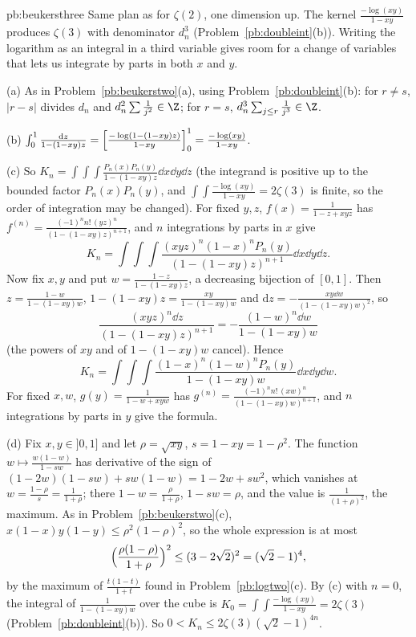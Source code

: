 \begin{solution}{pb:beukersthree}
\idea Same plan as for $\zeta(2)$, one dimension up. The kernel $\frac{-\log(xy)}{1-xy}$ produces $\zeta(3)$ with denominator $d_n^3$
(Problem~\ref{pb:doubleint}(b)). Writing the logarithm as an integral in a third variable gives room for a change of variables that
lets us integrate by parts in both $x$ and $y$.

\writeup (a) As in Problem~\ref{pb:beukerstwo}(a), using Problem~\ref{pb:doubleint}(b): for $r\ne s$, $|r-s|$ divides $d_n$ and $d_n^2\sum\frac1{j^2}\in\Z$; for
$r=s$, $d_n^3\sum_{j\le r}\frac1{j^3}\in\Z$.

(b) $\int_0^1\frac{\mathrm dz}{1-(1-xy)z}=\Bigl[\frac{-\log(1-(1-xy)z)}{1-xy}\Bigr]_0^1=\frac{-\log(xy)}{1-xy}$.

(c) So $K_n=\int\!\!\int\!\!\int\frac{P_n(x)P_n(y)}{1-(1-xy)z}\dd x\dd y\dd z$ (the integrand is positive up to the bounded factor $P_n(x)P_n(y)$, and
$\int\!\!\int\frac{-\log(xy)}{1-xy}=2\zeta(3)$ is finite, so the order of integration may be changed). For fixed $y,z$, $f(x)=\frac1{1-z+xyz}$ has
$f^{(n)}=\frac{(-1)^nn!\,(yz)^n}{(1-(1-xy)z)^{n+1}}$, and $n$ integrations by parts in $x$ give
\[
K_n=\int\!\!\int\!\!\int\frac{(xyz)^n(1-x)^nP_n(y)}{(1-(1-xy)z)^{n+1}}\dd x\dd y\dd z.
\]
Now fix $x,y$ and put $w=\frac{1-z}{1-(1-xy)z}$, a decreasing bijection of $[0,1]$. Then $z=\frac{1-w}{1-(1-xy)w}$,
$1-(1-xy)z=\frac{xy}{1-(1-xy)w}$ and $\mathrm dz=-\frac{xy\dd w}{(1-(1-xy)w)^2}$, so
\[
\frac{(xyz)^n\dd z}{(1-(1-xy)z)^{n+1}}=-\frac{(1-w)^n\dd w}{1-(1-xy)w}
\]
(the powers of $xy$ and of $1-(1-xy)w$ cancel). Hence
\[
K_n=\int\!\!\int\!\!\int\frac{(1-x)^n(1-w)^nP_n(y)}{1-(1-xy)w}\dd x\dd y\dd w.
\] For fixed $x,w$,
$g(y)=\frac1{1-w+xyw}$ has $g^{(n)}=\frac{(-1)^nn!\,(xw)^n}{(1-(1-xy)w)^{n+1}}$, and $n$ integrations by parts in $y$ give the formula.

(d) Fix $x,y\in]0,1]$ and let $\rho=\sqrt{xy}$, $s=1-xy=1-\rho^2$. The function $w\mapsto\frac{w(1-w)}{1-sw}$ has derivative of the sign of
$(1-2w)(1-sw)+sw(1-w)=1-2w+sw^2$, which vanishes at $w=\frac{1-\rho}{s}=\frac1{1+\rho}$; there $1-w=\frac\rho{1+\rho}$, $1-sw=\rho$, and the value
is $\frac1{(1+\rho)^2}$, the maximum. As in Problem~\ref{pb:beukerstwo}(c), $x(1-x)y(1-y)\le\rho^2(1-\rho)^2$, so the whole expression is at most
\[
\Bigl(\frac{\rho(1-\rho)}{1+\rho}\Bigr)^2\le(3-2\sqrt2)^2=(\sqrt2-1)^4,
\]
by the maximum of $\frac{t(1-t)}{1+t}$ found in Problem~\ref{pb:logtwo}(c). By (c) with $n=0$, the integral of $\frac1{1-(1-xy)w}$ over the cube is
$K_0=\int\!\!\int\frac{-\log(xy)}{1-xy}=2\zeta(3)$ (Problem~\ref{pb:doubleint}(b)). So $0<K_n\le2\zeta(3)(\sqrt2-1)^{4n}$.


\end{solution}
